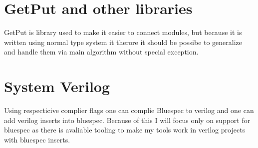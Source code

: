 \documentclass{article}
\begin{document}
\section{GetPut and other libraries}
    GetPut is library used to make it easier to connect modules,
    but because it is written using normal type system it therore it should be possibe to generalize and handle them via main algorithm without special exception.

\section{System Verilog}
    Using respecticive complier flags one can complie Bluespec to verilog and one can add verilog inserts into bluespec. Because of this I will focus only on support for bluespec as there is avaliable tooling to make my tools work in verilog projects with bluespec inserts.

\
\end{document}
